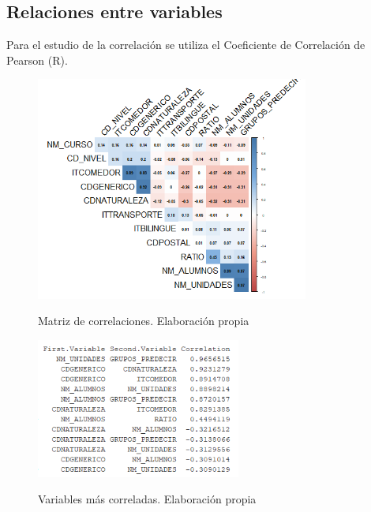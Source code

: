 \begin{subappendices}
\subsection{Relaciones entre variables}
	\label{appendix:AB3}
Para el estudio de la correlación se utiliza el Coeficiente de Correlación de Pearson (R).
\begin{figure}[htb]
	\centering
	\caption{Matriz de correlaciones. Elaboración propia}
	\includegraphics[width=0.8\textwidth]{recursos/ImagenesR/matrizcorrelacion}
	\label{fig:matrizcorrelaciones}
\end{figure}
\FloatBarrier


\begin{figure}[htb]
	\centering
	\caption{Variables más correladas. Elaboración propia}
	\includegraphics[width=0.6\textwidth]{recursos/ImagenesR/mayorescorrelaciones}
	\label{fig:mayorescorrelaciones}
\end{figure}
\FloatBarrier


\end{subappendices}
